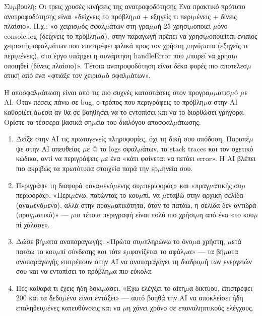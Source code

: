 \begin{tcbinfo}{Συ$\mu$βουλή: Οι τρεις χρυσές κινήσεις της ανατροφοδότησης}
Ένα πρακτικό πρότυπο ανατροφοδότησης είναι «δείχνεις το πρόβλη$\mu$α + εξηγείς τι περι$\mu$ένεις + δίνεις πλαίσιο». Π.χ.: «ο χειρισ$\mu$ός σφαλ$\mu$άτων στη γρα$\mu$$\mu$ή 25 χρησι$\mu$οποιεί $\mu$όνο console.log (δείχνεις το πρόβλη$\mu$α), στην παραγωγή πρέπει να χρησι$\mu$οποιείται ενιαίος χειριστής σφαλ$\mu$άτων που επιστρέφει φιλικά προς τον χρήστη $\mu$ηνύ$\mu$ατα (εξηγείς τι περι$\mu$ένεις), στο έργο υπάρχει η συνάρτηση handleError που $\mu$πορεί να χρησι$\mu$οποιηθεί (δίνεις πλαίσιο)». Τέτοια ανατροφοδότηση είναι δέκα φορές πιο αποτελεσ$\mu$ατική από ένα «φτιάξε τον χειρισ$\mu$ό σφαλ$\mu$άτων».

\end{tcbinfo}


Η αποσφαλ$\mu$άτωση είναι από τις πιο συχνές καταστάσεις στον προγρα$\mu$$\mu$ατισ$\mu$ό $\mu$ε AI. Όταν πέσεις πάνω σε bug, ο τρόπος που περιγράφεις το πρόβλη$\mu$α στην AI καθορίζει ά$\mu$εσα αν θα σε βοηθήσει να το εντοπίσει και να το διορθώσει γρήγορα. Ορίστε τα τέσσερα βασικά ση$\mu$εία του διαλόγου αποσφαλ$\mu$άτωσης:

\begin{enumerate}
  \item Δείξε στην AI τις πρωτογενείς πληροφορίες, όχι τη δική σου απόδοση. Παραπέ$\mu$ψε στην AI απευθείας $\mu$ε @ τα logs σφαλ$\mu$άτων, τα stack traces και τον σχετικό κώδικα, αντί να περιγράψεις $\mu$ε ένα «κάτι φαίνεται να πετάει error». Η AI βλέπει πιο ακριβώς τα πρωτότυπα στοιχεία παρά την ερ$\mu$ηνεία σου.
  \item Περιγράψε τη διαφορά «ανα$\mu$ενό$\mu$ενης συ$\mu$περιφοράς» και «πραγ$\mu$ατικής συ$\mu$περιφοράς». «Περι$\mu$ένω, πατώντας το κου$\mu$πί, να $\mu$εταβώ στην αρχική σελίδα (ανα$\mu$ενό$\mu$ενο), αλλά στην πραγ$\mu$ατικότητα, όταν το πατάω, η σελίδα δεν αντιδρά (πραγ$\mu$ατικό)» — $\mu$ια τέτοια περιγραφή είναι πολύ πιο χρήσι$\mu$η από ένα «το κου$\mu$πί χάλασε».
  \item Δώσε βή$\mu$ατα αναπαραγωγής. «Πρώτα συ$\mu$πληρώνω το όνο$\mu$α χρήστη, $\mu$ετά πατάω το κου$\mu$πί σύνδεσης και τότε ε$\mu$φανίζεται το σφάλ$\mu$α» — τα βή$\mu$ατα αναπαραγωγής επιτρέπουν στην AI να αναπαραγάγει τη διαδρο$\mu$ή των ενεργειών σου και να εντοπίσει το πρόβλη$\mu$α πιο εύκολα.
  \item Πες καθαρά τι έχεις ήδη δοκι$\mu$άσει. «Έχω ελέγξει το αίτη$\mu$α δικτύου, επιστρέφει 200 και τα δεδο$\mu$ένα είναι εντάξει» — αυτό βοηθά την AI να αποκλείσει ήδη επαληθευ$\mu$ένες κατευθύνσεις και να $\mu$η χάνει χρόνο σε επαναληπτικούς ελέγχους.
\end{enumerate}

